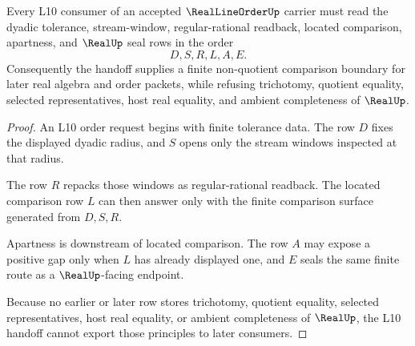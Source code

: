 \begin{theorem}
\label{thm:real-line-order-l10-handoff}
Every L10 consumer of an accepted $\RealLineOrderUp$ carrier must read the dyadic tolerance, stream-window, regular-rational readback, located comparison, apartness, and $\RealUp$ seal rows in the order
$$
D,S,R,L,A,E .
$$
Consequently the handoff supplies a finite non-quotient comparison boundary for later real algebra and order packets, while refusing trichotomy, quotient equality, selected representatives, host real equality, and ambient completeness of $\RealUp$.
\end{theorem}
\begin{proof}
An L10 order request begins with finite tolerance data. The row $D$ fixes the displayed dyadic radius, and $S$ opens only the stream windows inspected at that radius.

The row $R$ repacks those windows as regular-rational readback. The located comparison row $L$ can then answer only with the finite comparison surface generated from $D,S,R$.

Apartness is downstream of located comparison. The row $A$ may expose a positive gap only when $L$ has already displayed one, and $E$ seals the same finite route as a $\RealUp$-facing endpoint.

Because no earlier or later row stores trichotomy, quotient equality, selected representatives, host real equality, or ambient completeness of $\RealUp$, the L10 handoff cannot export those principles to later consumers.
\end{proof}




